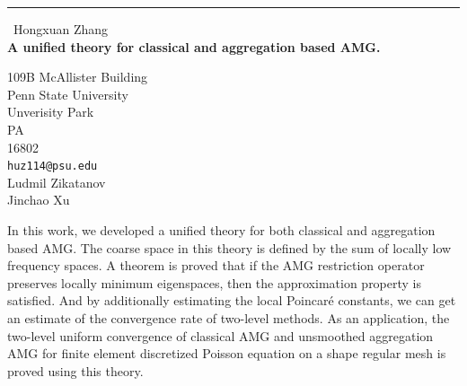 \documentclass{report}
\begin{document}
\begin{center}
\rule{6in}{1pt} \
{\large Hongxuan Zhang \\
{\bf  A unified theory for classical and aggregation based AMG.}}

109B McAllister Building \\ Penn State University \\ Unverisity Park \\ PA \\ 16802
\\
{\tt huz114@psu.edu}\\
Ludmil Zikatanov\\
Jinchao Xu\end{center}

In this work, we developed a unified theory for both classical and
aggregation based AMG. The coarse space in this theory is defined by the
sum of locally low frequency spaces. A theorem is proved that if the AMG
restriction operator preserves locally minimum eigenspaces, then the
approximation property is satisfied. And by additionally estimating the
local Poincar{\'e} constants, we can get an estimate of the convergence
rate of two-level methods. As an application, the two-level uniform
convergence of classical AMG and unsmoothed aggregation AMG for finite
element discretized Poisson equation on a shape regular mesh is proved
using this theory.
\end{document}
